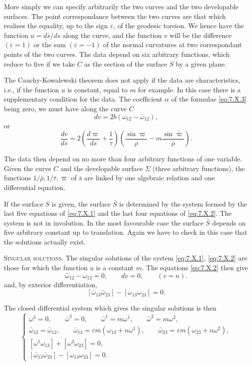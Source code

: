 \documentclass[leqno,11pt]{book}
\numberwithin{equation}{chapter}
\theoremstyle{shape1}
\theoremstyle{shape0}
\theoremstyle{shape2}
\theoremstyle{definition}
\begin{document}
More simply we can specify arbitrarily the two curves and the two developable surfaces. The point correspondance between the two curves are that which realises the equality, up to the sign $\varepsilon$, of the geodesic torsion. We hence have the function $u=d\bar s/ds$ along the curve, and the function $v$ will be the difference $(\varepsilon=1)$ or the sum $(\varepsilon=-1)$ of the normal curvatures at two correspondant points of the two curves. The data depend on six arbitrary functions, which reduce to five if we take $C$ as the section of the surface $S$ by a given plane.

The Cauchy-Kowalewski theorem does not apply if the data are characteristics, i.e., if the function $u$ is constant, equal to $m$ for example. In this case there is a supplementary condition for the data. The coefficient $\alpha$ of the formulae \eqref{eq:7.X.3} being zero, we must have along the curve $C$
\[
dv=2b(\omega_{12}-\bar\omega_{12}),
\]
or
\[
\frac{dv}{ds}=2\left(\frac{d\varpi}{ds}+\frac{1}{\tau}\right)\left(\frac{\sin\varpi}{\rho}-m\frac{\sin\bar\varpi}{\bar\rho}\right).
\]

The data then depend on no more than four arbitrary functions of one variable. Given the curve $C$ and the developable surface $\Sigma$ (three arbitrary functions), the functions $1/\bar\rho,1/\bar\tau,\bar\varpi$ of $\bar s$ are linked by one algebraic relation and one differential equation.

If the surface $S$ is given, the surface $\bar S$ is determined by the system formed by the last five equations of \eqref{eq:7.X.1} and the last four equations of \eqref{eq:7.X.2}. The system is not in involution. In the most favourable case the surface $\bar S$ depends on five arbitrary constant up to translation. Again we have to check in this case that the solutions actually exist.

\vspace{12pt}\fsec\textsc{Singular solutions}. The singular solutions of the system \eqref{eq:7.X.1}, \eqref{eq:7.X.2} are those for which the function $u$ is a constant $m$. The equations \eqref{eq:7.X.2} then give
\[
\bar\omega_{12}-\omega_{12}=0,\qquad dv=0,\qquad(v=n).
\]
and, by exterior differentiation,
\[
[\bar\omega_{13}\bar\omega_{23}]-[\omega_{13}\omega_{23}]=0.
\]

The closed differential system which gives the singular solutions is then
\begin{equation}
  \label{eq:7.X.4}\tag{X, 4}
  \left\{
    \begin{gathered}
      \omega^{3}=0,\qquad\bar\omega^{3}=0,\qquad\bar\omega^{1}=m\omega^{1},\qquad\bar\omega^{2}=m\omega^{2},\\
      \bar\omega_{12}=\bar\omega_{12},\qquad\bar\omega_{13}=\varepsilon m(\omega_{13}+n\omega^{1}),\qquad\bar\omega_{23}=\varepsilon m(\omega_{23}+n\omega^{2}),\\
      [\omega^{1}\omega_{13}]+[\omega^{2}\omega_{23}]=0,\\
      [\bar\omega_{13}\bar\omega_{23}]-[\omega_{13}\omega_{23}]=0.
    \end{gathered}
  \right.
\end{equation}
\end{document}

